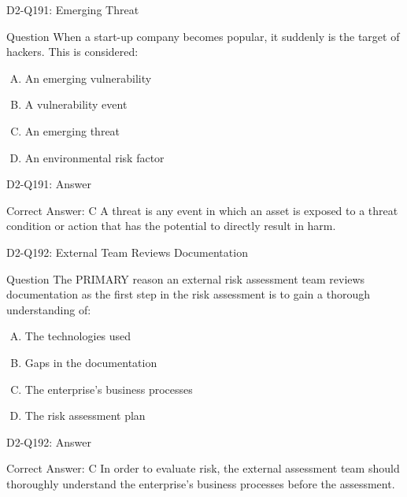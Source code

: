 \documentclass{beamer}
\begin{document}
	\begin{frame}{D2-Q191: Emerging Threat}
		\begin{block}{Question}
			When a start-up company becomes popular, it suddenly is the target of hackers. This is considered:
		\end{block}
		\begin{enumerate}[(A)]
			\item An emerging vulnerability
			\item A vulnerability event
			\item An emerging threat
			\item An environmental risk factor
		\end{enumerate}
	\end{frame}
	\begin{frame}{D2-Q191: Answer}
		\begin{block}{Correct Answer: C}
			A threat is any event in which an asset is exposed to a threat condition or action that has the potential to directly result in harm.
		\end{block}
	\end{frame}
	
	\begin{frame}{D2-Q192: External Team Reviews Documentation}
		\begin{block}{Question}
			The PRIMARY reason an external risk assessment team reviews documentation as the first step in the risk assessment is to gain a thorough understanding of:
		\end{block}
		\begin{enumerate}[(A)]
			\item The technologies used
			\item Gaps in the documentation
			\item The enterprise's business processes
			\item The risk assessment plan
		\end{enumerate}
	\end{frame}
	\begin{frame}{D2-Q192: Answer}
		\begin{block}{Correct Answer: C}
			In order to evaluate risk, the external assessment team should thoroughly understand the enterprise's business processes before the assessment.
		\end{block}
	\end{frame}
	
\end{document}
